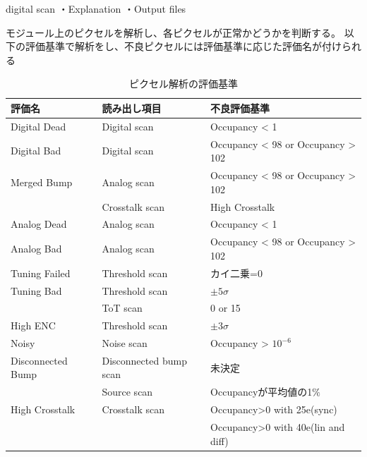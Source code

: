 digital scan
・Explanation
・Output files


モジュール上のピクセルを解析し、各ピクセルが正常かどうかを判断する。
以下の評価基準で解析をし、不良ピクセルには評価基準に応じた評価名が付けられる

\begin{table}[tbp]
\begin{center}
\caption[ピクセル解析の評価基準]{ピクセル解析の評価基準\cite{3-1}}
\label{pixel_analysis_criteria}
  \begin{tabular}{|lll|} \hline
    評価名 & 読み出し項目 & 不良評価基準 \\ \hline
    Digital Dead      & Digital scan           & Occupancy < 1 \\ \hline
    Digital Bad       & Digital scan           & Occupancy < 98 or Occupancy > 102\\\hline 
    Merged Bump       & Analog scan            & Occupancy < 98 or Occupancy > 102 \\ 
                      & Crosstalk scan         & High Crosstalk\\ \hline
    Analog Dead       & Analog scan            & Occupancy < 1 \\ \hline
    Analog Bad        & Analog scan            & Occupancy < 98 or Occupancy > 102 \\ \hline
    Tuning Failed     & Threshold scan         & カイ二乗=0 \\ \hline
    Tuning Bad        & Threshold scan         & $\pm5\sigma$\\ 
                      & ToT scan               & 0 or 15 \\ \hline
    High ENC          & Threshold scan         & $\pm3\sigma$ \\ \hline
    Noisy             & Noise scan             & Occupancy > $10^{-6}$\\ \hline
    Disconnected Bump & Disconnected bump scan & 未決定 \\ 
                      & Source scan            & Occupancyが平均値の1$\%$ \\ \hline
    High Crosstalk    & Crosstalk scan         & Occupancy>0 with 25e(sync)\\
                      &                        & Occupancy>0 with 40e(lin and diff)\\ \hline 
  \end{tabular}
\end{center}
\end{table}

